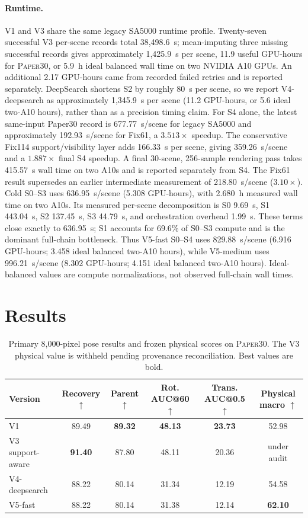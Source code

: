 \documentclass[10pt,twocolumn]{article}
\newcommand{\paperthirty}{\textsc{Paper30}}
\begin{document}
\paragraph{Runtime.}
V1 and V3 share the same legacy SA5000 runtime profile.  Twenty-seven
successful V3 per-scene records total 38,498.6~s; mean-imputing three missing
successful records gives approximately 1,425.9~s per scene, 11.9 useful
GPU-hours for \paperthirty{}, or 5.9~h ideal balanced wall time on two NVIDIA
A10 GPUs.  An additional 2.17 GPU-hours came from recorded failed retries and
is reported separately.  DeepSearch shortens S2 by roughly 80~s per scene, so
we report V4-deepsearch as approximately 1,345.9~s per scene (11.2 GPU-hours,
or 5.6 ideal two-A10 hours), rather than as a precision timing claim.
For S4 alone, the latest same-input Paper30 record is 677.77~s/scene for
legacy SA5000 and approximately 192.93~s/scene for Fix61, a $3.513\times$
speedup.  The conservative Fix114 support/visibility layer adds 166.33~s per
scene, giving 359.26~s/scene and a $1.887\times$ final S4 speedup.  A final
30-scene, 256-sample rendering pass takes 415.57~s wall time on two A10s and is
reported separately from S4.  The Fix61 result supersedes an earlier
intermediate measurement of 218.80~s/scene ($3.10\times$).  Cold S0--S3 uses
636.95~s/scene (5.308 GPU-hours), with 2.680~h measured wall time on two A10s.
Its measured per-scene decomposition is S0 9.69~s, S1 443.04~s, S2 137.45~s,
S3 44.79~s, and orchestration overhead 1.99~s. These terms close exactly to
636.95~s; S1 accounts for 69.6\% of S0--S3 compute and is the dominant
full-chain bottleneck.
Thus V5-fast S0--S4 uses 829.88~s/scene (6.916 GPU-hours; 3.458 ideal balanced
two-A10 hours), while V5-medium uses 996.21~s/scene (8.302 GPU-hours; 4.151
ideal balanced two-A10 hours). Ideal-balanced values are compute
normalizations, not observed full-chain wall times.

\section{Results}

\begin{table}[t]
\centering
\caption{Primary 8,000-pixel pose results and frozen physical scores on
\paperthirty{}.  The V3 physical value is withheld pending provenance
reconciliation.  Best values are bold.}
\label{tab:quality}
\small
\begin{tabular}{lccccc}
\toprule
Version & Recovery $\uparrow$ & Parent $\uparrow$ & Rot. AUC@60 $\uparrow$ &
Trans. AUC@0.5 $\uparrow$ & Physical macro $\uparrow$ \\
\midrule
V1 & 89.49 & \textbf{89.32} & \textbf{48.13} & \textbf{23.73} & 52.98 \\
V3 support-aware & \textbf{91.40} & 87.80 & 48.11 & 20.36 & under audit \\
V4-deepsearch & 88.22 & 80.14 & 31.34 & 12.19 & 54.58 \\
V5-fast & 88.22 & 80.14 & 31.38 & 12.14 & \textbf{62.10} \\
\bottomrule
\end{tabular}
\end{table}
\end{document}
